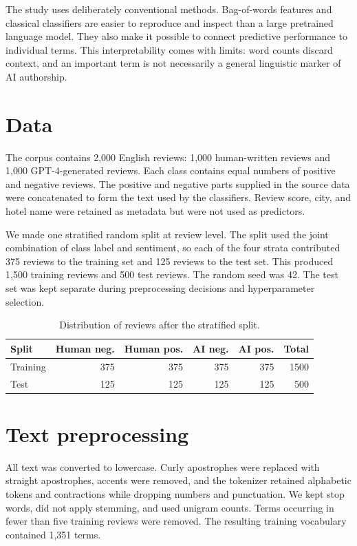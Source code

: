 \documentclass[onecolumn]{jmlr}
\begin{document}
The study uses deliberately conventional methods. Bag-of-words features and classical classifiers are easier to reproduce and inspect than a large pretrained language model. They also make it possible to connect predictive performance to individual terms. This interpretability comes with limits: word counts discard context, and an important term is not necessarily a general linguistic marker of AI authorship.

\section{Data}

The corpus contains 2,000 English reviews: 1,000 human-written reviews and 1,000 GPT-4-generated reviews. Each class contains equal numbers of positive and negative reviews. The positive and negative parts supplied in the source data were concatenated to form the text used by the classifiers. Review score, city, and hotel name were retained as metadata but were not used as predictors.

We made one stratified random split at review level. The split used the joint combination of class label and sentiment, so each of the four strata contributed 375 reviews to the training set and 125 reviews to the test set. This produced 1,500 training reviews and 500 test reviews. The random seed was 42. The test set was kept separate during preprocessing decisions and hyperparameter selection.

\begin{table}[ht]
\centering
\caption{Distribution of reviews after the stratified split.}
\label{tab:split}
\begin{tabular}{lrrrrr}
\toprule
Split & Human neg. & Human pos. & AI neg. & AI pos. & Total \\
\midrule
Training & 375 & 375 & 375 & 375 & 1500 \\
Test     & 125 & 125 & 125 & 125 & 500 \\
\bottomrule
\end{tabular}
\end{table}

\section{Text preprocessing}

All text was converted to lowercase. Curly apostrophes were replaced with straight apostrophes, accents were removed, and the tokenizer retained alphabetic tokens and contractions while dropping numbers and punctuation. We kept stop words, did not apply stemming, and used unigram counts. Terms occurring in fewer than five training reviews were removed. The resulting training vocabulary contained 1,351 terms.
\end{document}

